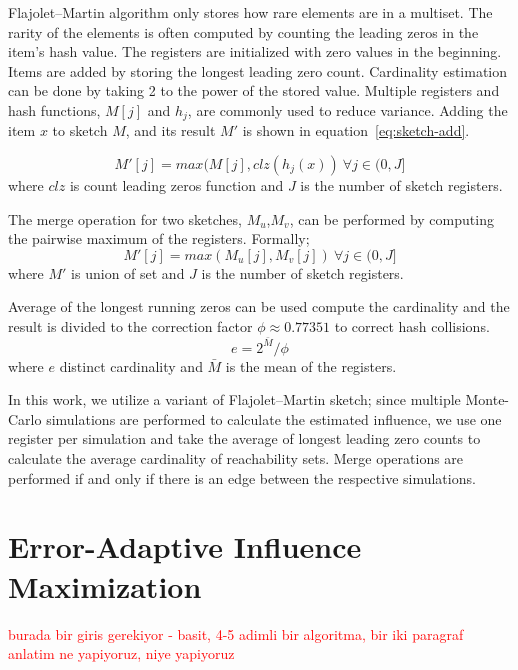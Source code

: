 \documentclass[10pt,journal,compsoc]{IEEEtran}
\newcommand\kktodo[1]{\textcolor{red}{#1}}
\begin{document}
Flajolet–Martin algorithm only stores how rare elements are in a multiset. The rarity of the elements is often computed by counting the leading zeros in the item's hash value.  The registers are initialized with zero values in the beginning. Items are added by storing the longest leading zero count. Cardinality estimation can be done by taking 2 to the power of the stored value. Multiple registers and hash functions, $M[j]$ and $h_j$, are commonly used to reduce variance.
Adding the item $x$ to sketch $M$, and its result $M'$ is shown in equation~\ref{eq:sketch-add}.

\begin{equation}
    \label{eq:sketch-add}
    M'[j] = max(M[j],clz(h_j(x)) ~ \forall j\in(0,J]
\end{equation} where $clz$ is count leading zeros function and $J$ is the number of sketch registers.

The merge operation for two sketches, $M_u$,$M_v$, can be performed by computing the pairwise maximum of the registers. Formally; 
\begin{equation}
    \label{eq:sketch-merge}
    M'[j] = max(M_u[j],M_v[j]) ~ \forall j\in(0,J]
\end{equation} 
where $M'$ is union of set and $J$ is the number of sketch registers.

Average of the longest running zeros can be used compute the cardinality and the result is divided to the correction factor $\phi \approx 0.77351$ to correct hash collisions.
\begin{equation}
    \label{eq:sketch-estimate}
    e = 2^{\bar{M}}/\phi
\end{equation} 
where $e$ distinct cardinality and $\bar{M}$ is the mean of the registers.

In this work, we utilize a variant of Flajolet–Martin sketch; since multiple Monte-Carlo simulations are performed to calculate the estimated influence, we use one register per simulation and take the average of longest leading zero counts to calculate the average cardinality of reachability sets. Merge operations are performed if and only if there is an edge between the respective simulations. 

\section{Error-Adaptive Influence Maximization}\label{sec:method}

\kktodo{burada bir giris gerekiyor - basit, 4-5 adimli bir algoritma, bir iki paragraf anlatim ne yapiyoruz, niye yapiyoruz}
\end{document}
